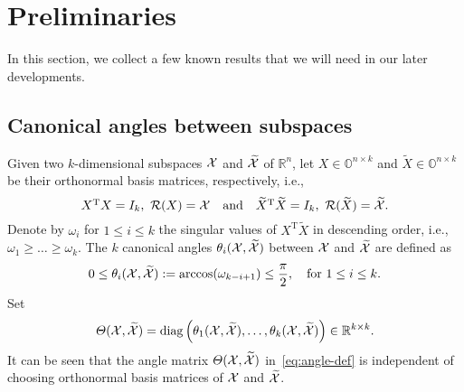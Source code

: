 \documentclass[11pt]{article}
\def\bbO{\mathbb{O}}
\def\bbR{\mathbb{R}}
\def\cR{{\cal R}}
\def\cX{{\cal X}}
\DeclareMathOperator{\diag}{diag}
\DeclareMathOperator{\tr}{tr}
\DeclareMathOperator{\T}{T}
\def\wtd{\widetilde}
\theoremstyle{definition}
\numberwithin{equation}{section}
\numberwithin{figure}{section}
\numberwithin{table}{section}
\begin{document}

\iffalse
For example, the orthogonal linear discriminant analysis (OLDA) determines $X$ by
$$
\max_{X^{\T}X=I_k}\frac {\tr(X^{\T}S_bX)}{\tr(X^{\T}S_wX)},
$$
a maximization problem on  the Stiefel manifold
$$
\bbO^{n\times k}=\left\{X\in\bbR^{n\times k}\ |\  X^{\T}X=I_k\right\},
$$
where $S_b$ and $S_w$ are two scattering matrices, symmetric and at least positive semidefinite;
The orthogonal canonical correlation analysis (OCCA) determines two projection matrices $X_i\in\bbO^{n_i\times k}$ $(i=1,2)$ by
$$
\max_{X^{\T}X=I_k}\frac {X_1^{\T}C_{12}X_2}{\sqrt{\tr(X_1^{\T}A_1X_1)\tr(X_2^{\T}A_2X_2)}},
$$
a maximization problem on the product of the Stiefel manifolds $\bbO^{n_i\times k}$ for $i=1,2$.

The idea is to project
high dimesnion
\fi

\section{Preliminaries}
In this section, we collect a few known results that we will need in our later developments.

\subsection{Canonical angles between subspaces}
Given two $k$-dimensional subspaces $\cX$ and $\wtd\cX$ of $\bbR^{n}$,
let $X\in\bbO^{n\times k}$ and $\wtd X\in\bbO^{n\times k}$ be their orthonormal basis matrices,
respectively, i.e.,
\[
X^{\T}X=I_k,\ \cR(X)=\cX\quad\mbox{and}\quad \wtd X^{\T}\wtd X=I_k,\ \cR(\wtd X)=\wtd \cX.
\]
Denote by $\omega_i$ for $1\le i\le k$ the singular values of $X^{\T}\wtd X$ in descending order, i.e.,
$\omega_1\ge\dots\ge\omega_k$. The $k$ canonical angles $\theta_i(\cX,\wtd\cX)$ between $\cX$ and $\wtd\cX$
are defined as
\[
0\le\theta_i(\cX,\wtd\cX):=\arccos(\omega_{k-i+1})\le\frac{\pi}{2},\quad\mbox{for\ $1\le i\le k$} .
\]
Set
\begin{equation}\label{eq:angle-def}
\Theta(\cX,\wtd\cX)=\diag\left(\theta_1(\cX,\wtd\cX),\dots,\theta_k(\cX,\wtd\cX)\right)\in\bbR^{k\times k}.
\end{equation}
It can be seen that the angle matrix $\Theta(\cX,\wtd\cX)$ in~\eqref{eq:angle-def} is independent of
choosing orthonormal basis matrices of $\cX$ and $\wtd\cX$.
\end{document}
